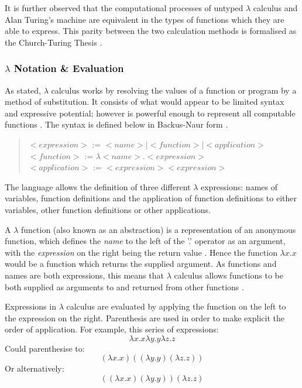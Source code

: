 \documentclass[12pt,a4paper]{article}
\begin{document}
It is further observed that the computational processes of untyped $\lambda$ calculus and Alan Turing's machine are equivalent in the types of functions which they are able to express. This parity between the two calculation methods is formalised as the Church-Turing Thesis \cite{churchTuringThesis,ImperativeFunctional}.

\subsubsection{$\lambda$ Notation \& Evaluation}

As stated, $\lambda$ calculus works by resolving the values of a function or program by a method of substitution. It consists of what would appear to be limited syntax and expressive potential; however is powerful enough to represent all computable functions \cite{church1936}. The syntax is defined below in Backus-Naur form \cite{bnf}.

\begin{quote}
    {$<expression> \mbox{ := }  <name> | <function> | <application>$}
    {$<function> \mbox{ := } \lambda <name>.<expression>$}\newline
    {$<application> \mbox{ := } <expression><expression> $}\newline
\end{quote}

The language allows the definition of three different $\lambda$ expressions: names of variables, function definitions and the application of function definitions to either variables, other function definitions or other applications.

A $\lambda$ function (also known as an abstraction) is a representation of an anonymous function, which defines the \emph{name} to the left of the '.' operator as an argument, with the \emph{expression} on the right being the return value \cite{church1936}. Hence the function $\lambda x.x$ would be a function which returns the supplied argument. As functions and names are both expressions, this means that $\lambda$ calculus allows functions to be both supplied as arguments to and returned from other functions \cite{church1936}.

Expressions in $\lambda$ calculus are evaluated by applying the function on the left to the expression on the right. Parenthesis are used in order to make explicit the order of application. For example, this series of expressions:
\begin{displaymath}
    \lambda x.x \lambda y.y \lambda z.z
\end{displaymath}
Could parenthesise to:
\begin{displaymath}
    (\lambda x.x) ((\lambda y.y) (\lambda z.z))
\end{displaymath}
Or alternatively:
\begin{displaymath}
    ((\lambda x.x) (\lambda y.y)) (\lambda z.z)
\end{displaymath}
\end{document}
